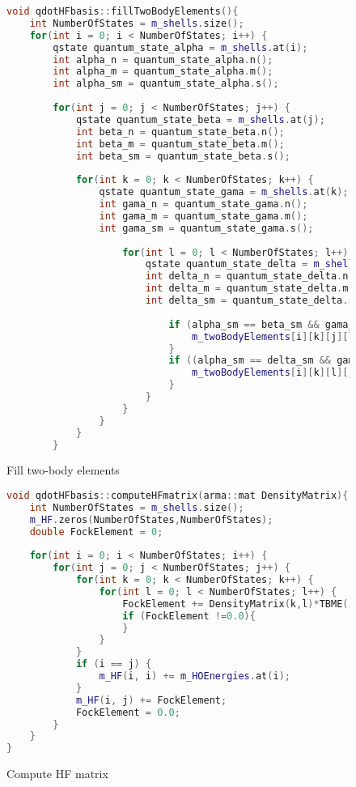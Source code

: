\documentclass[twoside,english]{uiofysmaster}
\theoremstyle{definition}
\begin{document}
\begin{figure}
\begin{lstlisting}[language=C++]
void qdotHFbasis::fillTwoBodyElements(){
	int NumberOfStates = m_shells.size();	
	for(int i = 0; i < NumberOfStates; i++) {
		qstate quantum_state_alpha = m_shells.at(i);
		int alpha_n = quantum_state_alpha.n();
		int alpha_m = quantum_state_alpha.m();
		int alpha_sm = quantum_state_alpha.s();
			
		for(int j = 0; j < NumberOfStates; j++) {
			qstate quantum_state_beta = m_shells.at(j);
			int beta_n = quantum_state_beta.n();
			int beta_m = quantum_state_beta.m();
			int beta_sm = quantum_state_beta.s();
			
			for(int k = 0; k < NumberOfStates; k++) {
				qstate quantum_state_gama = m_shells.at(k);
				int gama_n = quantum_state_gama.n();
				int gama_m = quantum_state_gama.m();
				int gama_sm = quantum_state_gama.s();
					
					for(int l = 0; l < NumberOfStates; l++) {
						qstate quantum_state_delta = m_shells.at(l);
						int delta_n = quantum_state_delta.n();
						int delta_m = quantum_state_delta.m();
						int delta_sm = quantum_state_delta.s();
							
							if (alpha_sm == beta_sm && gama_sm == delta_sm ){
								m_twoBodyElements[i][k][j][l] = Coulomb_HO(homega, alpha_n, alpha_m, gama_n, gama_m, beta_n, beta_m,  delta_n, delta_m);
							}
							if ((alpha_sm == delta_sm && gama_sm == beta_sm )){
								m_twoBodyElements[i][k][l][j] = Coulomb_HO(homega, alpha_n, alpha_m, gama_n, gama_m, delta_n, delta_m, beta_n, beta_m);
							}
						}
					}
				}
			}
		}
\end{lstlisting}
\caption{Fill two-body elements}
\end{figure}

\begin{figure}
\begin{lstlisting}[language=C++]
void qdotHFbasis::computeHFmatrix(arma::mat DensityMatrix){
	int NumberOfStates = m_shells.size();
	m_HF.zeros(NumberOfStates,NumberOfStates);
	double FockElement = 0;
	
	for(int i = 0; i < NumberOfStates; i++) {
		for(int j = 0; j < NumberOfStates; j++) {
			for(int k = 0; k < NumberOfStates; k++) {
				for(int l = 0; l < NumberOfStates; l++) {
					FockElement += DensityMatrix(k,l)*TBME(i,k,j,l);
					if (FockElement !=0.0){
					}
				}
			}
			if (i == j) {
				m_HF(i, i) += m_HOEnergies.at(i);
			}
			m_HF(i, j) += FockElement;
			FockElement = 0.0;
		}
	}
}
\end{lstlisting}
\caption{Compute HF matrix}
\end{figure}
\end{document}
